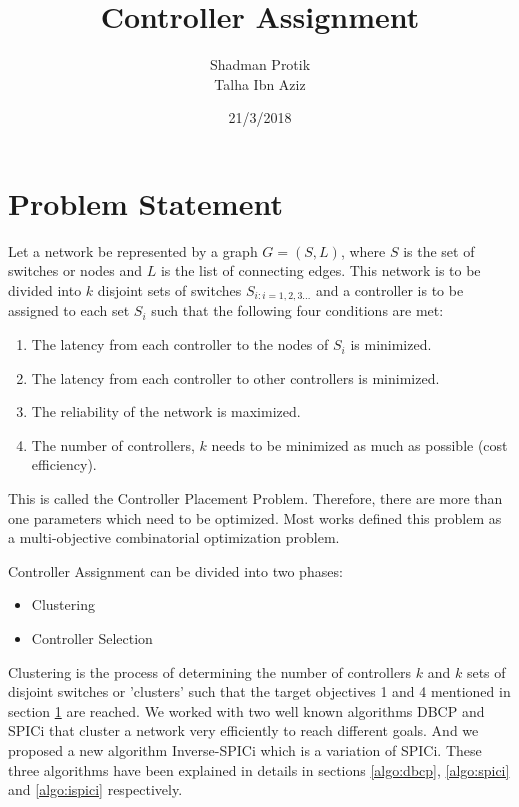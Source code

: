 \documentclass[10pt]{extarticle}
\begin{document}
	
	\twocolumn
	
	\title{Controller Assignment}
	\author{Shadman Protik\\Talha Ibn Aziz }
	\date{21/3/2018}
	\maketitle
	
	\section{Problem Statement} \label{prob}
	Let a network be represented by a graph $G=(S,L)$, where $S$ is the set of switches or nodes and $L$ is the list of connecting edges. This network is to be divided into $k$ disjoint sets of switches $S_{i:i=1,2,3...}$ and a controller is to be assigned to each set $S_i$ such that the following four conditions are met:
	\begin{enumerate}
		\item The latency from each controller to the nodes of $S_i$ is minimized.
		\item The latency from each controller to other controllers is minimized.
		\item The reliability of the network is maximized.
		\item The number of controllers, $k$ needs to be minimized as much as possible (cost efficiency). 
	\end{enumerate}

	This is called the Controller Placement Problem.
	Therefore, there are more than one parameters which need to be optimized. Most works\cite{dbcp} defined this problem as a multi-objective combinatorial optimization problem.
	
	Controller Assignment can be divided into two phases:
	\begin{itemize}
		\item Clustering
		\item Controller Selection
	\end{itemize}

	Clustering is the process of determining the number of controllers $k$ and $k$ sets of disjoint switches or 'clusters' such that the target objectives 1 and 4 mentioned in section \ref{prob} are reached. We worked with two well known algorithms DBCP\cite{dbcp} and SPICi\cite{spici} that cluster a network very efficiently to reach different goals. And we proposed a new algorithm Inverse-SPICi which is a variation of SPICi. These three algorithms have been explained in details in sections \ref{algo:dbcp}, \ref{algo:spici} and \ref{algo:ispici} respectively.
	
\end{document}
